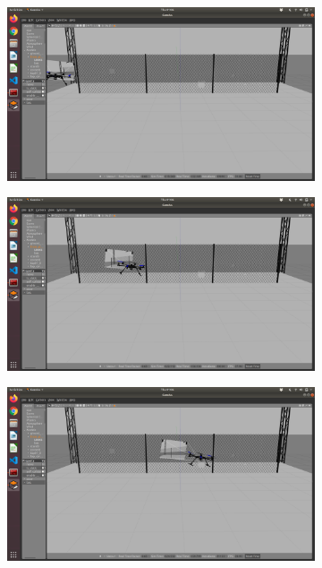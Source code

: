 \documentclass[../Head/Main.tex]{subfiles}
\begin{document}
\begin{figure}[h]
\begin{subfigure}{\figSize}
        \end{subfigure}
        \begin{subfigure}{\figSize}
            \centering
            \includegraphics[width=\textwidth]{../Figures/simulation/Simulation_03.png}
        \end{subfigure}
        \begin{subfigure}{\figSize}
            \centering
            \includegraphics[width=\textwidth]{../Figures/simulation/Simulation_04.png}
        \end{subfigure}
        \begin{subfigure}{\figSize}
            \centering
            \includegraphics[width=\textwidth]{../Figures/simulation/Simulation_05.png}

\end{subfigure}
\end{figure}
\end{document}

